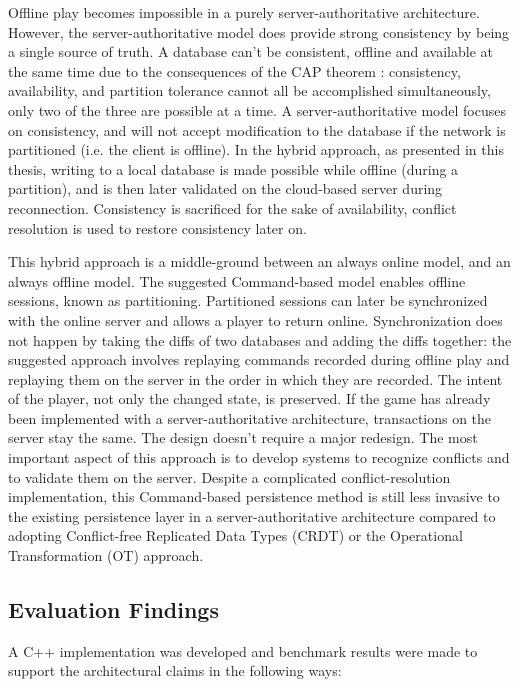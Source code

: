 \documentclass{article}
\begin{document}
Offline play becomes impossible in a purely server-authoritative architecture. However, the server-authoritative model does provide strong consistency by being a single source of truth. A database can't be consistent, offline and available at the same time due to the consequences of the CAP theorem \autocite{gilbert2002cap}: consistency, availability, and partition tolerance cannot all be accomplished simultaneously, only two of the three are possible at a time. A server-authoritative model focuses on consistency, and will not accept modification to the database if the network is partitioned (i.e. the client is offline). In the hybrid approach, as presented in this thesis, writing to a local database is made possible while offline (during a partition), and is then later validated on the cloud-based server during reconnection. Consistency is sacrificed for the sake of availability, conflict resolution is used to restore consistency later on.

This hybrid approach is a middle-ground between an always online model, and an always offline model. The suggested Command-based model enables offline sessions, known as partitioning. Partitioned sessions can later be synchronized with the online server and allows a player to return online. Synchronization does not happen by taking the diffs of two databases and adding the diffs together: the suggested approach involves replaying commands recorded during offline play and replaying them on the server in the order in which they are recorded. The intent of the player, not only the changed state, is preserved. If the game has already been implemented with a server-authoritative architecture, transactions on the server stay the same. The design doesn't require a major redesign. The most important aspect of this approach is to develop systems to recognize conflicts and to validate them on the server. Despite a complicated conflict-resolution implementation, this Command-based persistence method is still less invasive to the existing persistence layer in a server-authoritative architecture compared to adopting Conflict-free Replicated Data Types (CRDT) or the Operational Transformation (OT) approach.

\subsection{Evaluation Findings}

A C++ implementation was developed and benchmark results were made to support the architectural claims in the following ways:
\end{document}
